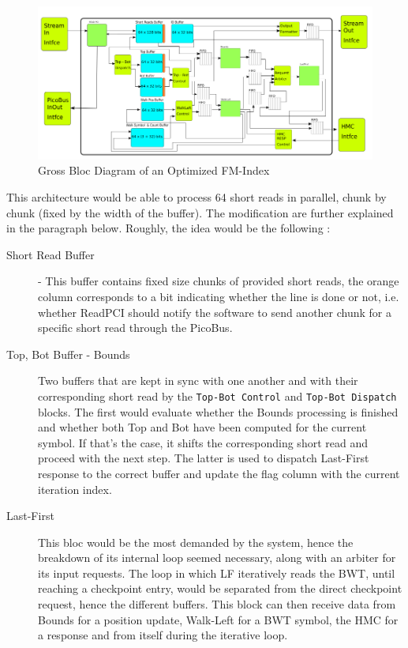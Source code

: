 \begin{figure}[H]
    \centering
    \includegraphics [scale = 0.5]{Figures/FM_OPTI.png}
    \caption{Gross Bloc Diagram of an Optimized FM-Index}
    \label{fig:FM_FIFO}
\end{figure}

This architecture would be able to process 64 short reads in parallel, chunk by chunk (fixed by the width of the buffer). The modification are further explained in the paragraph below.
Roughly, the idea would be the following :
\begin{description}
    \item [Short Read Buffer] - This buffer contains fixed size chunks of provided short reads, the orange column corresponds to a bit indicating whether the line is done or not, i.e. whether ReadPCI should notify the software to send another chunk for a specific short read through the PicoBus.
    \item [Top, Bot Buffer - Bounds] Two buffers that are kept in sync with one another and with their corresponding short read by the \texttt{Top-Bot Control} and \texttt{Top-Bot Dispatch} blocks. The first would evaluate whether the Bounds processing is finished and whether both Top and Bot have been computed for the current symbol. If that's the case, it shifts the corresponding short read and proceed with the next step. The latter is used to dispatch Last-First response to the correct buffer and update the flag column with the current iteration index.
    \item [Last-First] This bloc would be the most demanded by the system, hence the breakdown of its internal loop seemed necessary, along with an arbiter for its input requests. The loop in which LF iteratively reads the BWT, until reaching a checkpoint entry, would be separated from the direct checkpoint request, hence the different buffers. This block can then receive data from Bounds for a position update, Walk-Left for a BWT symbol, the HMC for a response and from itself during the iterative loop.
\end{description}

